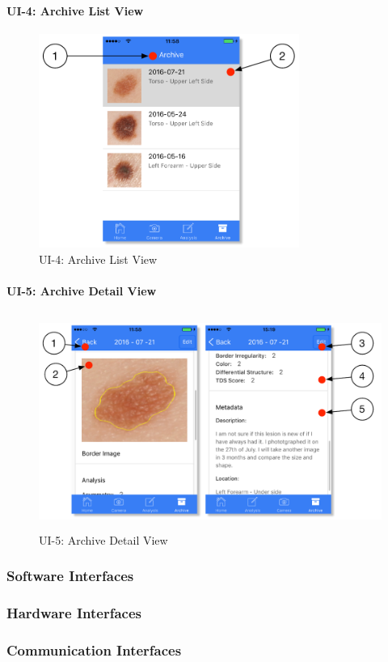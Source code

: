             \paragraph{UI-4: Archive List View}

                \begin{figure}[H]
                    \centering
                    \includegraphics[height=7cm]{assets/GUI/ARCHIVE_01.pdf}
                    \caption{UI-4: Archive List View}
                    \label{fig:ui-4}
                \end{figure}

            \paragraph{UI-5: Archive Detail View}

                \begin{figure}[H]
                    \centering
                    \includegraphics[height=7cm]{assets/GUI/ARCHIVE_02.pdf}
                    \caption{UI-5: Archive Detail View}
                    \label{fig:ui-5}
                \end{figure}


        \subsubsection{Software Interfaces}
        \subsubsection{Hardware Interfaces}
        \subsubsection{Communication Interfaces}